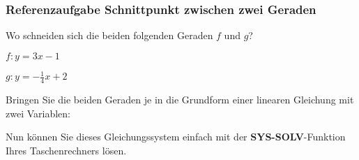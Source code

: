 \subsubsection{Referenzaufgabe Schnittpunkt zwischen zwei Geraden}

Wo schneiden sich die beiden folgenden Geraden $f$ und $g$?

 $f: y=3x - 1$


$g: y=-\frac{1}{4}x +2$

Bringen Sie die beiden Geraden je in die Grundform einer linearen
Gleichung mit zwei Variablen:


Nun können Sie dieses Gleichungssystem einfach mit
der \textbf{SYS-SOLV}-Funktion Ihres Taschenrechners lösen.
